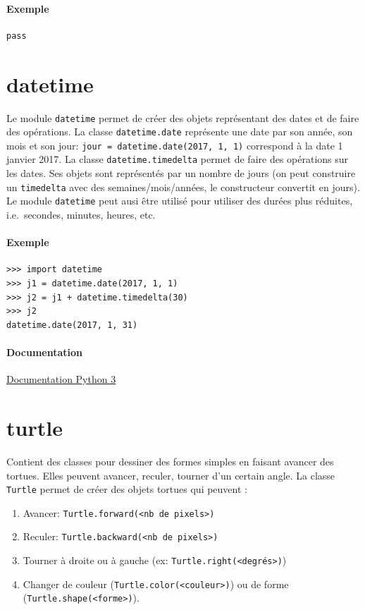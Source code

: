 \documentclass[a4paper, 10pt]{article}
\begin{document}
\paragraph{Exemple}
\begin{verbatim}
pass
\end{verbatim}



\section{datetime}\label{datetime}

Le module \texttt{datetime} permet de créer des objets représentant des dates et de faire des opérations. La classe \texttt{datetime.date} représente une date par son année, son mois et son jour: \texttt{jour = datetime.date(2017, 1, 1)} correspond à la date 1\ier{} janvier 2017.
La classe \texttt{datetime.timedelta} permet de faire des opérations sur les dates. Ses objets sont représentés par un nombre de jours (on peut construire un \texttt{timedelta} avec des semaines/mois/années, le constructeur convertit en jours).
Le module \texttt{datetime} peut ausi être utilisé pour utiliser des durées plus réduites, i.e.\ secondes, minutes, heures, etc.

\paragraph{Exemple}
\begin{verbatim}
>>> import datetime
>>> j1 = datetime.date(2017, 1, 1)
>>> j2 = j1 + datetime.timedelta(30)
>>> j2
datetime.date(2017, 1, 31)
\end{verbatim}


\paragraph*{Documentation} \href{https://docs.python.org/fr/3/library/datetime.html}{Documentation Python 3}

\section{turtle}

Contient des classes pour dessiner des formes simples en faisant avancer des tortues. Elles peuvent avancer, reculer, tourner d'un certain angle.
La classe \texttt{Turtle} permet de créer des objets tortues qui peuvent :
\begin{enumerate}
        \item Avancer: \texttt{Turtle.forward(<nb de pixels>)}
        \item Reculer: \texttt{Turtle.backward(<nb de pixels>)}
        \item Tourner à droite ou à gauche (ex: \texttt{Turtle.right(<degrés>)})
        \item Changer de couleur (\texttt{Turtle.color(<couleur>)}) ou de forme (\texttt{Turtle.shape(<forme>)}).
\end{enumerate}
\end{document}
